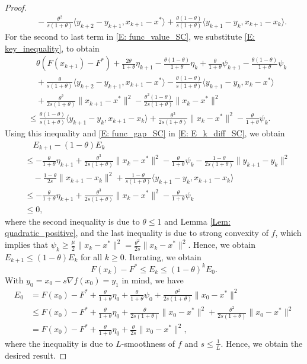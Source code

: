 \documentclass[pdflatex,sn-mathphys-num]{sn-jnl}
\theoremstyle{thmstyleone}
\theoremstyle{thmstyletwo}
\theoremstyle{thmstylethree}
\begin{document}
\begin{proof}
\begin{equation}
\begin{aligned}
&\quad -\frac{\theta^2}{s(1+\theta)}\langle y_{k+2}-y_{k+1}, x_{k+1}-x^* \rangle
   + \frac{\theta(1-\theta)}{s(1+\theta)}\langle y_{k+1}-y_k, x_{k+1}-x_k \rangle. 
\end{aligned}
\end{equation}
For the second to last term in \eqref{E: func_value_SC}, we substitute \eqref{E: key_inequality}, to obtain
\begin{align*}
&\quad \theta\left( F(x_{k+1}) - F^* \right) + \frac{2\theta}{1+\theta}\eta_{k+1} - \frac{\theta(1-\theta)}{1+\theta}\eta_k 
   + \frac{\theta}{1+\theta}\psi_{k+1}
   - \frac{\theta(1-\theta)}{1+\theta}\psi_k \\
&\quad +\frac{\theta}{s(1+\theta)}\langle y_{k+2}-y_{k+1}, x_{k+1}-x^* \rangle
   - \frac{\theta(1-\theta)}{s(1+\theta)}\langle y_{k+1}-y_k, x_k-x^* \rangle \\
&\quad + \frac{\theta^2}{2s(1+\theta)}\| x_{k+1} - x^* \|^2
   - \frac{\theta^2(1-\theta)}{2s(1+\theta)}\| x_k - x^* \|^2 \\
&\le \frac{\theta(1-\theta)}{s(1+\theta)}\langle y_{k+1}-y_k, x_{k+1}-x_k \rangle
   + \frac{\theta^3}{2s(1+\theta)}\| x_k - x^* \|^2 
   - \frac{\theta}{1+\theta}\psi_k. 
\end{align*}
Using this inequality and \eqref{E: func_gap_SC} in \eqref{E: E_k_diff_SC}, we obtain
\begin{align*}
&\quad E_{k+1}-(1-\theta)E_k \\
&\le - \frac{\theta}{1+\theta}\eta_{k+1}
     + \frac{\theta^3}{2s(1+\theta)}\| x_k - x^* \|^2
     - \frac{\theta}{1+\theta}\psi_k 
     - \frac{1-\theta}{2s(1+\theta)}\| y_{k+1} - y_k \|^2\\
&\quad  
    - \frac{1-\theta}{2s}\| x_{k+1}-x_k \|^2   
    + \frac{1-\theta}{s(1+\theta)}\langle y_{k+1}-y_k, x_{k+1}-x_k \rangle \\
&\le - \frac{\theta}{1+\theta}\eta_{k+1}
     + \frac{\theta^3}{2s(1+\theta)}\| x_k - x^* \|^2
     - \frac{\theta}{1+\theta}\psi_k\\
&\le 0,   
\end{align*}
where the second inequality is due to $\theta\le 1$ and Lemma \ref{Lem: quadratic_positive}, and the last inequality is due to strong convexity of $f$, which implies that $\psi_k \ge \frac{\mu}{2}\| x_k - x^* \|^2 = \frac{\theta^2}{2s}\| x_k - x^* \|^2$. Hence, we obtain $E_{k+1} \le (1-\theta)E_k$ for all $k\ge 0$. Iterating, we obtain
$$ F(x_k) - F^* \le E_k \le (1-\theta)^kE_0. $$ 
With $y_0 = x_0-s\nabla f(x_0)=y_1$ in mind, we have
\begin{align*}
E_0
&= F(x_0) - F^* + \frac{\theta}{1+\theta}\eta_0 + \frac{\theta}{1+\theta}\psi_0 + \frac{\theta^2 }{2s(1+\theta)}\| x_0 - x^* \|^2 \\
&\le F(x_0) - F^* + \frac{\theta}{1+\theta}\eta_0 + \frac{\theta}{2s(1+\theta)}\| x_0 - x^* \|^2 
 + \frac{\theta^2 }{2s(1+\theta)}\| x_0 - x^* \|^2 \\
&= F(x_0) - F^* + \frac{\theta}{1+\theta}\eta_0 + \frac{\theta}{2s}\| x_0 - x^* \|^2,    
\end{align*}
where the inequality is due to $L$-smoothness of $f$ and $s\le \frac{1}{L}$. Hence, we obtain the desired result.
\end{proof}
\end{document}
